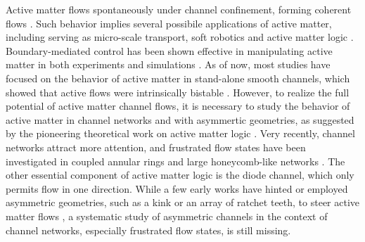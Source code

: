 \documentclass[%
10pt,
superscriptaddress,
twocolumn,
 amsmath,amssymb,
 aps,prx,
]{revtex4-2}
\begin{document}
Active matter flows spontaneously under channel confinement, forming coherent flows  \cite{Wioland2016,Wu2017,Morin2018,Hardouin2019,Hardouin2020}. 
Such behavior implies several possibile applications of active matter, including serving as micro-scale transport, soft robotics and active matter logic \cite{Thampi2022,Woodhouse2017}.
Boundary-mediated control has been shown effective in manipulating active matter in both experiments \cite{Lushi2014,Wioland2016,Wioland2016,Wu2017,Morin2018,Liu2019,Ross2019,Hardouin2019} and simulations \cite{Voituriez2005,Marenduzzo2007,Shendruk2017,Vaidya2024}.
As of now, most studies have focused on the behavior of active matter in stand-alone smooth channels, which showed that active flows were intrinsically bistable \cite{Wu2017,Morin2018}.
However, to realize the full potential of active matter channel flows, it is necessary to study the behavior of active matter in channel networks and with asymmertic geometries, as suggested by the pioneering theoretical work on active matter logic \cite{Woodhouse2017}.
Very recently, channel networks attract more attention, and frustrated flow states have been investigated in coupled annular rings \cite{Hardouin2020} and large honeycomb-like networks \cite{Jorge2024}.
The other essential component of active matter logic is the diode channel, which only permits flow in one direction.
While a few early works have hinted or employed asymmetric geometries, such as a kink or an array of ratchet teeth, to steer active matter flows \cite{ElizabethHulme2008,DiLeonardo2010,Wu2017,Hardouin2020,Ray2023,Vaidya2024}, a systematic study of asymmetric channels in the context of channel networks, especially frustrated flow states, is still missing. 

\end{document}
